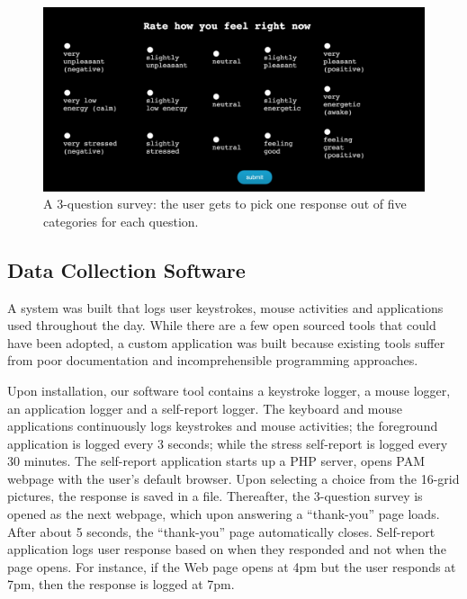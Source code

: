 \documentclass{article}
\begin{document}
\begin{figure}[ht]
	\vskip 0.2in
	\begin{center}
		\centerline{\includegraphics[width=\columnwidth]{ema}}
		\caption{A 3-question survey: the user gets to pick one response out of five categories for each question. 
		}
		\label{ema}
	\end{center}
	\vskip -0.2in
\end{figure} 


\subsection{Data Collection Software}
A system was built that logs user keystrokes, mouse activities and applications used throughout the day. While there are a few open sourced tools that could have been adopted, a custom application was built because existing tools suffer from poor documentation and incomprehensible programming approaches. 

Upon installation, our software tool contains a keystroke logger, a mouse logger, an application logger and a self-report logger. The keyboard and mouse applications continuously logs keystrokes and mouse activities; the foreground application is logged every 3 seconds; while the stress self-report is logged every 30 minutes. The self-report application starts up a PHP server, opens PAM webpage with the user's default browser. Upon selecting a choice from the 16-grid pictures, the response is saved in a file. Thereafter, the 3-question survey is opened as the next webpage, which upon answering a ``thank-you'' page loads. After about 5 seconds, the ``thank-you'' page automatically closes. Self-report application logs user response based on when they responded and not when the page opens. For instance, if the Web page opens at 4pm but the user responds at 7pm, then the response is logged at 7pm. 
\end{document}
